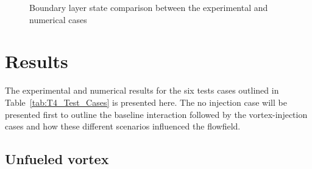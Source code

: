 \documentclass{AIAA}
\begin{document}
\begin{figure}[!h]
\center
{}
\caption{Boundary layer state comparison between the experimental and numerical cases}
\label{fig:Num_Exp_BLcompar}
\end{figure} 



\section{Results}

The experimental and numerical results for the six tests cases outlined in Table~\ref{tab:T4_Test_Cases} is presented here.
The no injection case will be presented first to outline the baseline interaction followed by the vortex-injection cases and how these different scenarios influenced the flowfield.

\subsection{Unfueled vortex}
\end{document}
